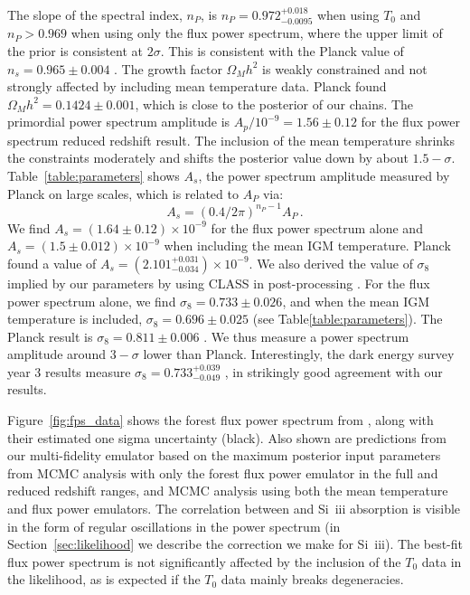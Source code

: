 The slope of the spectral index, $n_P$, is $n_P = 0.972^{+0.018}_{-0.0095}$ when using $T_0$ and $n_P > 0.969$ when using only the flux power spectrum, where the upper limit of the prior is consistent at $2\sigma$. This is consistent with the Planck value of $n_s=0.965 \pm 0.004$  \cite{2020A&A...641A...6P}. The growth factor $\Omega_M h^2$ is weakly constrained and not strongly affected by including mean temperature data. Planck found $\Omega_M h^2 = 0.1424\pm0.001$, which is close to the posterior of our chains. The primordial power spectrum amplitude is $A_p/10^{-9} = 1.56 \pm 0.12$ for the flux power spectrum reduced redshift result. The inclusion of the mean temperature shrinks the constraints moderately and shifts the posterior value down by about $1.5-\sigma$.
Table~\ref{table:parameters} shows $A_s$, the power spectrum amplitude measured by Planck on large scales, which is related to $A_P$ via:
\begin{equation}
    A_s = \left(0.4/2\pi\right)^{n_P-1} A_P\,.
\end{equation}
We find $A_s = (1.64 \pm 0.12) \times10^{-9}$ for the flux power spectrum alone and $A_s = (1.5 \pm 0.012 )\times10^{-9}$ when including the mean IGM temperature.
Planck \cite{2020A&A...641A...6P} found a value of $A_s = \left(2.101^{+0.031}_{-0.034}\right)\times10^{-9}$. 
We also derived the value of $\sigma_8$ implied by our parameters by using CLASS in post-processing \cite{2011arXiv1104.2932L}. 
For the flux power spectrum alone, we find $\sigma_8 = 0.733 \pm 0.026$, and when the mean IGM temperature is included, $\sigma_8 = 0.696 \pm 0.025$ (see Table\ref{table:parameters}). The Planck result is $\sigma_8 = 0.811 \pm 0.006$ \cite{2020A&A...641A...6P}.
We thus measure a power spectrum amplitude around $3-\sigma$ lower than Planck. Interestingly, the dark energy survey year 3 results measure $\sigma_8 = 0.733^{+0.039}_{-0.049}$ \cite{2022PhRvD.105b3520A}, in strikingly good agreement with our results.

Figure~\ref{fig:fps_data} shows the \lya forest flux power spectrum from \cite{2019JCAP...07..017C}, along with their estimated one sigma uncertainty (black).
Also shown are predictions from our multi-fidelity emulator based on the maximum posterior input parameters from MCMC analysis with only the \lya forest flux power emulator in the full and reduced redshift ranges, and MCMC analysis using both the mean temperature and flux power emulators.
The correlation between \lya and Si~{\sc iii} absorption is visible in the form of regular oscillations in the power spectrum (in Section~\ref{sec:likelihood} we describe the correction we make for Si~{\sc iii}).
The best-fit flux power spectrum is not significantly affected by the inclusion of the $T_0$ data in the likelihood, as is expected if the $T_0$ data mainly breaks degeneracies.


